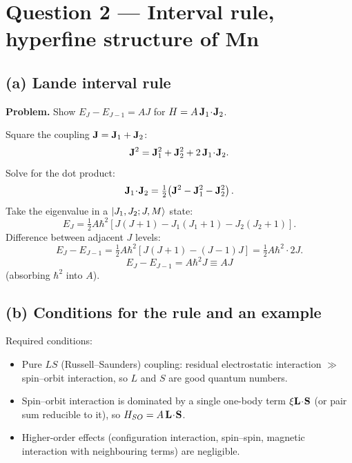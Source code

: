 \documentclass[11pt]{article}
\begin{document}
\section*{Question 2 --- Interval rule, hyperfine structure of Mn}

\subsection*{(a) Lande interval rule}

\textbf{Problem.} Show $E_{J}-E_{J-1}=AJ$ for $H=A\,\vb J_{1}\!\cdot\!\vb J_{2}$.

Square the coupling $\vb J=\vb J_{1}+\vb J_{2}$:
\[
\vb J^{2}=\vb J_{1}^{2}+\vb J_{2}^{2}+2\,\vb J_{1}\!\cdot\!\vb J_{2}.
\]
Solve for the dot product:
\[
\vb J_{1}\!\cdot\!\vb J_{2}=\tfrac{1}{2}\!\left(\vb J^{2}-\vb J_{1}^{2}-\vb J_{2}^{2}\right).
\]
Take the eigenvalue in a $\ket{J_{1},J_{2};J,M}$ state:
\[
E_{J}=\tfrac{1}{2}A\hbar^{2}\!\left[J(J+1)-J_{1}(J_{1}+1)-J_{2}(J_{2}+1)\right].
\]
Difference between adjacent $J$ levels:
\[
E_{J}-E_{J-1}=\tfrac{1}{2}A\hbar^{2}\!\left[J(J+1)-(J-1)J\right]=\tfrac{1}{2}A\hbar^{2}\cdot 2J.
\]
\[
\boxed{\;E_{J}-E_{J-1}=A\hbar^{2}J\equiv AJ\;}
\]
(absorbing $\hbar^{2}$ into $A$).

\subsection*{(b) Conditions for the rule and an example}

Required conditions:
\begin{itemize}\itemsep0pt
\item Pure $LS$ (Russell--Saunders) coupling: residual electrostatic interaction $\gg$ spin--orbit interaction, so $L$ and $S$ are good quantum numbers.
\item Spin--orbit interaction is dominated by a single one-body term $\xi\vb L\!\cdot\!\vb S$ (or pair sum reducible to it), so $H_{SO}=A\,\vb L\!\cdot\!\vb S$.
\item Higher-order effects (configuration interaction, spin--spin, magnetic interaction with neighbouring terms) are negligible.
\end{itemize}
\end{document}
